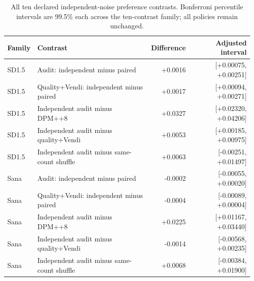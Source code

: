 \begin{table}[tp]
\centering\small
\caption{All ten declared independent-noise preference contrasts. Bonferroni percentile intervals are 99.5\% each across the ten-contrast family; all policies remain unchanged.}
\begin{tabular}{llrr}
\toprule Family & Contrast & Difference & Adjusted interval \\ \midrule
SD1.5 & Audit: independent minus paired & +0.0016 & [+0.00075, +0.00251]\\
SD1.5 & Quality+Vendi: independent minus paired & +0.0017 & [+0.00094, +0.00271]\\
SD1.5 & Independent audit minus DPM++8 & +0.0327 & [+0.02320, +0.04206]\\
SD1.5 & Independent audit minus quality+Vendi & +0.0053 & [+0.00185, +0.00975]\\
SD1.5 & Independent audit minus same-count shuffle & +0.0063 & [-0.00251, +0.01497]\\
Sana & Audit: independent minus paired & -0.0002 & [-0.00055, +0.00020]\\
Sana & Quality+Vendi: independent minus paired & -0.0004 & [-0.00089, +0.00004]\\
Sana & Independent audit minus DPM++8 & +0.0225 & [+0.01167, +0.03440]\\
Sana & Independent audit minus quality+Vendi & -0.0014 & [-0.00568, +0.00235]\\
Sana & Independent audit minus same-count shuffle & +0.0068 & [-0.00384, +0.01900]\\
\bottomrule
\end{tabular}
\end{table}

